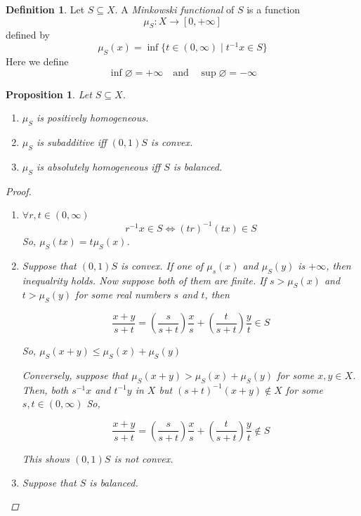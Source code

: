 \documentclass[a4paper,12pt]{article}
\theoremstyle{definition}
\newtheorem{definition}{Definition}
\theoremstyle{plain}
\newtheorem{proposition}{Proposition}
\theoremstyle{remark}
\begin{document}
\begin{definition}
    Let \(S \subseteq X\). A \emph{Minkowski functional} of \(S\) is a function \[\mu_S: X \to [0,+\infty]\] defined by
    \[\mu_S(x) = \inf \{t \in (0,\infty) \mid t^{-1}x \in S\}\] 
    Here we define
    \[ \inf \varnothing = + \infty \quad \mbox{and} \quad \sup \varnothing = - \infty \]
\end{definition}

\begin{proposition}
    \label{min-minkow}
    Let \(S \subseteq X\).
    \begin{enumerate}[label=(\alph*)]
        \item \(\mu_S\) is positively homogeneous.
        \item \(\mu_S\) is subadditive iff \((0,1)S\) is convex.
        \item \(\mu_S\) is absolutely homogeneous iff \(S\) is balanced.
    \end{enumerate}

    \begin{proof}
        \begin{enumerate}[label=(\alph*)]
            \item \(\forall r,t \in (0,\infty)\)
        \[ r^{-1}x \in S \Leftrightarrow (tr)^{-1}(tx) \in S\]
        So, \(\mu_S(tx) = t\mu_S(x)\).

            \item Suppose that \((0,1)S\) is convex. If one of \(\mu_s(x)\) and \(\mu_S(y)\) is \(+\infty\), then inequalrity holds. Now suppose both of them are finite. If \(s> \mu_S(x)\) and \(t> \mu_S(y)\) for some real numbers \(s\) and \(t\), then
            
            \[\frac{x+y}{s+t} = \left(\frac{s}{s+t} \right) \frac{x}{s} + \left( \frac{t}{s+t} \right) \frac{y}{t} \in S\]

            So, \(\mu_S(x+y) \le \mu_S(x) + \mu_S(y)\)

            Conversely, suppose that \(\mu_S(x+y) > \mu_S(x) + \mu_S(y)\) for some \(x,y \in X\). Then, both \(s^{-1}x\) and \(t^{-1}y\) in \(X\) but \((s+t)^{-1}(x+y) \notin X\) for some \(s,t \in (0,\infty)\) So,
            
            \[\frac{x+y}{s+t} = \left(\frac{s}{s+t} \right) \frac{x}{s} + \left( \frac{t}{s+t} \right) \frac{y}{t} \notin S\]
            
            This shows \((0,1)S\) is not convex.

            \item Suppose that \( S \) is balanced.
            

\end{enumerate}
\end{proof}
\end{proposition}
\end{document}
